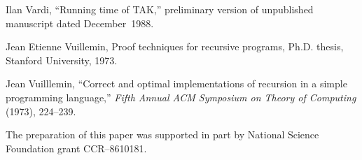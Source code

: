 \documentclass{article}
\begin{document}
\bib 
[14]\enspace
Ilan Vardi, ``Running time of TAK,'' preliminary version of
unpublished manuscript dated December~1988.

\bib
[15]\enspace
Jean Etienne Vuillemin, Proof techniques for recursive programs, Ph.D.
thesis, Stanford University, 1973.

\bib
[16]\enspace
Jean Vuilllemin, ``Correct and optimal implementations of recursion in
a simple programming language,'' {\sl Fifth Annual ACM Symposium on Theory
of Computing\/} (1973), 224--239.

\bigskip\bigskip

The preparation of this paper was supported in part by National
Science Foundation grant CCR--8610181.

\bye
\end{document}
